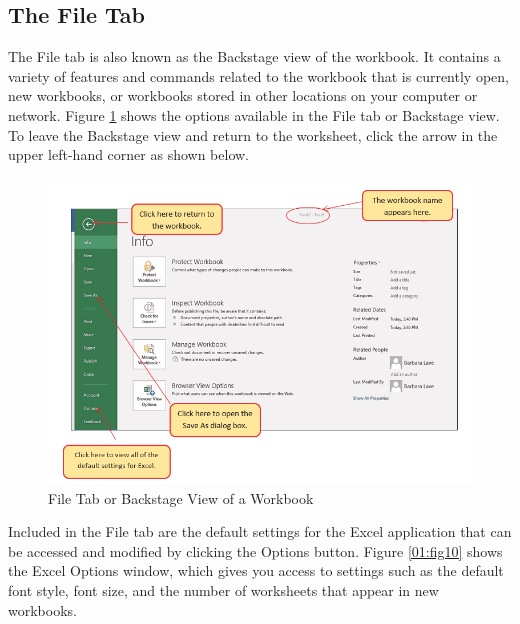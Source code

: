 \subsection{The File Tab}

The File tab is also known as the Backstage view of the workbook. It contains a variety of features and commands related to the workbook that is currently open, new workbooks, or workbooks stored in other locations on your computer or network. Figure \ref{01:fig09} shows the options available in the File tab or Backstage view. To leave the Backstage view and return to the worksheet, click the arrow in the upper left-hand corner as shown below.

\begin{figure}[H]
	\centering
	\includegraphics[width=\maxwidth{.95\linewidth}]{gfx/Ch01_fig09}
	\caption{File Tab or Backstage View of a Workbook}
	\label{01:fig09}
\end{figure}

Included in the File tab are the default settings for the Excel application that can be accessed and modified by clicking the Options button. Figure \ref{01:fig10} shows the Excel Options window, which gives you access to settings such as the default font style, font size, and the number of worksheets that appear in new workbooks.

